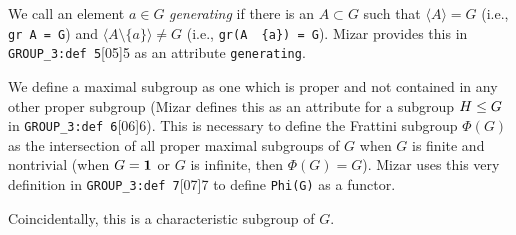 We call an element $a\in G$ \emph{generating} if there is an $A\subset G$
such that $\langle A\rangle = G$ (i.e., \texttt{gr A = G}) and
$\langle A\setminus\{a\}\rangle\neq G$ (i.e., \texttt{gr(A \ \{a\}) = G}).
Mizar provides this in \verb#GROUP_3:def 5#[05]{5} as
an attribute \verb#generating#.

We define a maximal subgroup as one which is proper and not contained in
any other proper subgroup (Mizar defines this as an attribute for a
subgroup $H\leq G$ in \verb#GROUP_3:def 6#[06]{6}).
This is necessary to define the Frattini subgroup $\Phi(G)$ as the
intersection of all proper maximal subgroups of $G$ when $G$ is finite
and nontrivial (when $G=\mathbf{1}$ or $G$ is infinite, then
$\Phi(G)=G$). Mizar uses this very definition in
\verb#GROUP_3:def 7#[07]{7} to define \texttt{Phi(G)}
as a functor.

Coincidentally, this is a characteristic subgroup of $G$.


